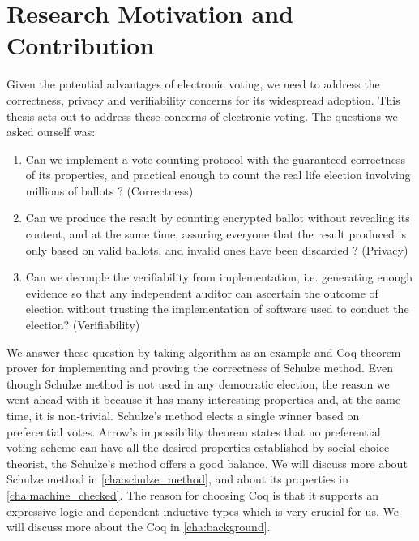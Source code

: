 \section{Research Motivation and Contribution}
Given the potential advantages of electronic voting,  we need to address
the correctness, privacy and verifiability concerns for its widespread adoption. 
This thesis sets out to address these concerns of electronic voting. 
The questions we asked ourself was:
 \begin{enumerate} 
  \item Can we implement a vote counting protocol with the  
    guaranteed correctness of its properties, and practical enough
    to count the real life election involving millions of ballots ? (Correctness)
  \item Can we produce the result by counting encrypted ballot without revealing 
  its content, and at the same time, 
  assuring everyone that the result produced is only based on valid ballots, 
  and invalid ones have been discarded ? (Privacy)
 \item Can we decouple the verifiability from implementation, i.e. 
    generating enough evidence so that any independent auditor can 
    ascertain the outcome of election without trusting the implementation 
    of software used to conduct the election? (Verifiability)
  \end{enumerate}


We answer these question by taking \cite{Schulze:2011:NMC} 
algorithm as an example and Coq \citep{Bertot:2004:ITP}
theorem prover  for implementing and proving the correctness of  Schulze method.
Even though Schulze method is not used in any democratic election, the reason 
 we went ahead with it because it has many interesting properties and, 
 at the same time, it is non-trivial.   Schulze's method elects  a single winner based on 
preferential votes.  Arrow's impossibility theorem \citep{Arrow:1950:DCS} states
 that no preferential voting 
scheme can have all the desired properties established by  social choice theorist,
the Schulze's method offers a good balance. We will discuss more about Schulze method in 
\ref{cha:schulze_method}, and about its properties in \ref{cha:machine_checked}. 
The reason for choosing Coq is that it supports an expressive logic and dependent 
inductive types which is very crucial for us. We will discuss more about the Coq in 
\ref{cha:background}. 

